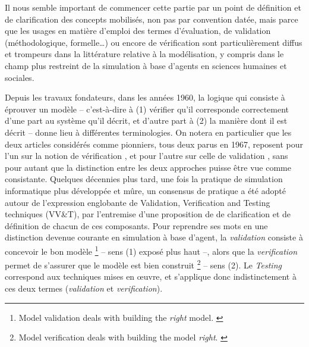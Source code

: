 Il nous semble important de commencer cette partie par un point de définition et de clarification des concepts mobilisés, non pas par convention datée, mais parce que les usages en matière d'emploi des termes d'évaluation, de validation (méthodologique, formelle\ldots) ou encore de vérification sont particulièrement diffus et trompeurs dans la littérature relative à la modélisation, y compris dans le champ plus restreint de la simulation à base d'agents en sciences humaines et sociales.

Depuis les travaux fondateurs, dans les années 1960, la logique qui consiste à éprouver un modèle -- c'est-à-dire à
(1) vérifier qu'il corresponde correctement d'une part au système qu'il décrit, et d'autre part à
(2) la manière dont il est décrit -- donne lieu à différentes terminologies.
On notera en particulier que les deux articles considérés comme pionniers, tous deux parus en 1967, reposent pour l'un sur la notion de vérification \autocite{naylor_verification_1967}, et pour l'autre sur celle de validation \autocite{hermann_validation_1967}, sans pour autant que la distinction entre les deux approches puisse être vue comme consistante.
Quelques décennies plus tard, une fois la pratique de simulation informatique plus développée et mûre, un consensus de pratique a été adopté autour de l'expression englobante de \og Validation, Verification and Testing techniques (VV\&T)\fg{}, par l'entremise d'une proposition de \textcite{balci_validation_1994} de clarification et de définition de chacun de ces composants.
Pour reprendre ses mots en une distinction devenue courante en simulation à base d'agent, la \textit{validation} consiste à concevoir le bon modèle 
\footnote{
	\og Model validation deals with building the \textit{right} model.\fg{} \autocite[121]{balci_validation_1994}
} -- sens (1) exposé plus haut --,
alors que la \textit{verification} permet de s'assurer que le modèle est bien construit
\footnote{
	\og Model verification deals with building the model \textit{right}.\fg{} \autocite[123]{balci_validation_1994}
} -- sens (2).
Le \og \textit{Testing}\fg{} correspond aux techniques mises en œuvre, et s'applique donc indistinctement à ces deux termes (\textit{validation} et \textit{verification}).

